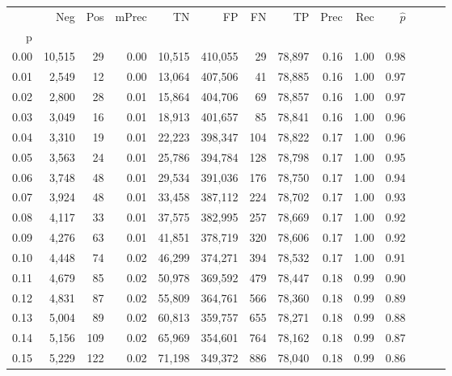 \begin{tabular}{rrrrrrrrrrrrrr}
\toprule
{} &     Neg &    Pos & mPrec &       TN &       FP &      FN &      TP &  Prec &   Rec & $\hat{p}$ \\
p    &         &        &       &          &          &         &         &       &       &           \\
\midrule
0.00 &  10,515 &     29 &  0.00 &   10,515 &  410,055 &      29 &  78,897 &  0.16 &  1.00 &      0.98 \\
0.01 &   2,549 &     12 &  0.00 &   13,064 &  407,506 &      41 &  78,885 &  0.16 &  1.00 &      0.97 \\
0.02 &   2,800 &     28 &  0.01 &   15,864 &  404,706 &      69 &  78,857 &  0.16 &  1.00 &      0.97 \\
0.03 &   3,049 &     16 &  0.01 &   18,913 &  401,657 &      85 &  78,841 &  0.16 &  1.00 &      0.96 \\
0.04 &   3,310 &     19 &  0.01 &   22,223 &  398,347 &     104 &  78,822 &  0.17 &  1.00 &      0.96 \\
0.05 &   3,563 &     24 &  0.01 &   25,786 &  394,784 &     128 &  78,798 &  0.17 &  1.00 &      0.95 \\
0.06 &   3,748 &     48 &  0.01 &   29,534 &  391,036 &     176 &  78,750 &  0.17 &  1.00 &      0.94 \\
0.07 &   3,924 &     48 &  0.01 &   33,458 &  387,112 &     224 &  78,702 &  0.17 &  1.00 &      0.93 \\
0.08 &   4,117 &     33 &  0.01 &   37,575 &  382,995 &     257 &  78,669 &  0.17 &  1.00 &      0.92 \\
0.09 &   4,276 &     63 &  0.01 &   41,851 &  378,719 &     320 &  78,606 &  0.17 &  1.00 &      0.92 \\
0.10 &   4,448 &     74 &  0.02 &   46,299 &  374,271 &     394 &  78,532 &  0.17 &  1.00 &      0.91 \\
0.11 &   4,679 &     85 &  0.02 &   50,978 &  369,592 &     479 &  78,447 &  0.18 &  0.99 &      0.90 \\
0.12 &   4,831 &     87 &  0.02 &   55,809 &  364,761 &     566 &  78,360 &  0.18 &  0.99 &      0.89 \\
0.13 &   5,004 &     89 &  0.02 &   60,813 &  359,757 &     655 &  78,271 &  0.18 &  0.99 &      0.88 \\
0.14 &   5,156 &    109 &  0.02 &   65,969 &  354,601 &     764 &  78,162 &  0.18 &  0.99 &      0.87 \\
0.15 &   5,229 &    122 &  0.02 &   71,198 &  349,372 &     886 &  78,040 &  0.18 &  0.99 &      0.86 \\

\end{tabular}
